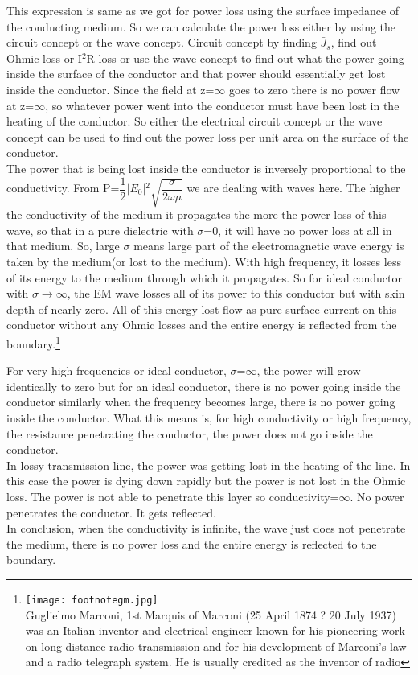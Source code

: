 This expression is same as we got for power loss using the surface impedance of the conducting medium. So we can calculate the power loss either by using the circuit concept or the wave concept. Circuit concept by finding $\bar{J}$$_{s}$, find out Ohmic loss or I$^{2}$R loss or use the wave concept to find out what the power going inside the surface of the conductor and that power should essentially get lost inside the conductor. Since the field at z=$\infty$ goes to zero there is no power flow at z=$\infty$, so whatever power went into the conductor must have been lost in the heating of the conductor. So either the electrical circuit concept or the wave concept can be used to find out the power loss per unit area on the surface of the conductor.\\

The power that is being lost inside the conductor is inversely proportional to the conductivity. From P=$\dfrac{1}{2}$$\lvert E_{0}\rvert$$^{2}$$\sqrt{\dfrac{\sigma}{2\omega\mu}}$ we are dealing with waves here. The higher the conductivity of the medium it propagates the more the power loss of this wave, so that in a pure dielectric with $\sigma$=0, it will have no power loss at all in that medium. So, large $\sigma$ means large part of the electromagnetic wave energy is taken by the medium(or lost to the medium). With high frequency, it  losses less of its energy to the medium through which it propagates. So for ideal conductor with $\sigma$$\longrightarrow$$\infty$, the EM wave losses all of its power to this conductor but with skin depth of nearly zero. All of this energy lost flow as pure surface current on this conductor without any Ohmic losses and the entire energy is reflected from the boundary.\footnote{\texttt{[image: footnotegm.jpg]}\\Guglielmo Marconi, 1st Marquis of Marconi (25 April 1874 ? 20 July 1937) was an Italian inventor and electrical engineer known for his pioneering work on long-distance radio transmission and for his development of Marconi's law and a radio telegraph system. He is usually credited as the inventor of radio}

For very high frequencies or ideal conductor, $\sigma$=$\infty$, the power will grow identically to zero but for an ideal conductor, there is no power going inside the conductor similarly when the frequency becomes large, there is no power going inside the conductor. What this means is, for high conductivity or high frequency, the resistance penetrating the conductor, the power does not go inside the conductor.\\

In lossy transmission line, the power was getting lost in the heating of the line. In this case the power is dying down rapidly but the power is not lost in the Ohmic loss. The power is not able to penetrate this layer so conductivity=$\infty$. No power penetrates the conductor. It gets reflected.\\

In conclusion, when the conductivity is infinite, the wave just does not penetrate the medium, there is no power loss and the entire energy is reflected to the boundary.
